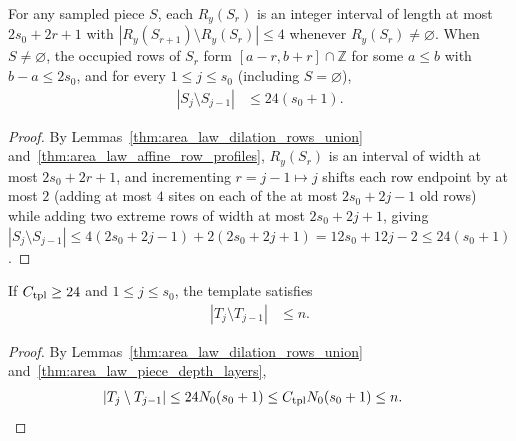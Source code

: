 \begin{lemma}
    \label{thm:area_law_piece_depth_layers}
    \leanok
    For any sampled piece $S$, each $R_y(S_r)$ is an integer interval of length at most $2s_0+2r+1$ with $|R_y(S_{r+1})\setminus R_y(S_r)|\le4$ whenever $R_y(S_r)\ne\varnothing$. When $S\ne\varnothing$, the occupied rows of $S_r$ form $[a-r,b+r]\cap\mathbb Z$ for some $a\le b$ with $b-a\le2s_0$, and for every $1\le j\le s_0$ (including $S=\varnothing$),
    \begin{align}
        |S_j\setminus S_{j-1}| & \le24(s_0+1).
    \end{align}
\end{lemma}
\begin{proof}
    \leanok
    By Lemmas~\ref{thm:area_law_dilation_rows_union} and~\ref{thm:area_law_affine_row_profiles}, $R_y(S_r)$ is an interval of width at most $2s_0+2r+1$, and incrementing $r=j-1\mapsto j$ shifts each row endpoint by at most $2$ (adding at most $4$ sites on each of the at most $2s_0+2j-1$ old rows) while adding two extreme rows of width at most $2s_0+2j+1$, giving $|S_j\setminus S_{j-1}|\le 4(2s_0+2j-1)+2(2s_0+2j+1)=12s_0+12j-2\le24(s_0+1)$.
\end{proof}

\begin{lemma}
    \label{thm:area_law_template_depth_layers}
    \leanok
    If $C_{\rm tpl}\ge24$ and $1\le j\le s_0$, the template satisfies
    \begin{align}
        |T_j\setminus T_{j-1}| & \le n.
    \end{align}
\end{lemma}
\begin{proof}
    \leanok
    By Lemmas~\ref{thm:area_law_dilation_rows_union} and~\ref{thm:area_law_piece_depth_layers},
    \begin{align}
        |T_j\setminus T_{j-1}|
         & \le24N_0(s_0+1)
        \le C_{\rm tpl}N_0(s_0+1)\le n.
    \end{align}
\end{proof}
